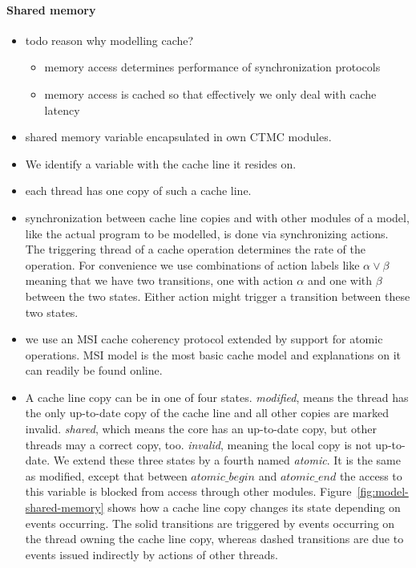 \documentclass[a4paper, 10pt]{article}
\begin{document}
\paragraph{Shared memory}
\label{sssec:analysis-modelchecking-modelling-shared-memory}
\begin{itemize}
	\item todo reason why modelling cache?
		\begin{itemize}
			\item memory access determines performance of synchronization protocols
			\item memory access is cached so that effectively we only deal with cache latency
		\end{itemize}
	\item shared memory variable encapsulated in own CTMC modules.
	\item We identify a variable with the cache line it resides on.
	\item each thread has one copy of such a cache line.
	\item synchronization between cache line copies and with other modules of a model, like the actual program to be modelled, is done via synchronizing actions. The triggering thread of a cache operation determines the rate of the operation. For convenience we use combinations of action labels like $\alpha \lor \beta$ meaning that we have two transitions, one with action $\alpha$ and one with $\beta$ between the two states. Either action might trigger a transition between these two states.
	\item we use an MSI cache coherency protocol extended by support for atomic operations. MSI model is the most basic cache model and explanations on it can readily be found online\cite{msi}.
	\item A cache line copy can be in one of four states. \emph{modified}, means the thread has the only up-to-date copy of the cache line and all other copies are marked invalid. \emph{shared}, which means the core has an up-to-date copy, but other threads may a correct copy, too. \emph{invalid}, meaning the local copy is not up-to-date. We extend these three states by a fourth named \emph{atomic}. It is the same as modified, except that between $\mathit{atomic\_begin}$ and $\mathit{atomic\_end}$ the access to this variable is blocked from access through other modules. Figure~\ref{fig:model-shared-memory} shows how a cache line copy changes its state depending on events occurring. The solid transitions are triggered by events occurring on the thread owning the cache line copy, whereas dashed transitions are due to events issued indirectly by actions of other threads.

\end{itemize}
\end{document}
